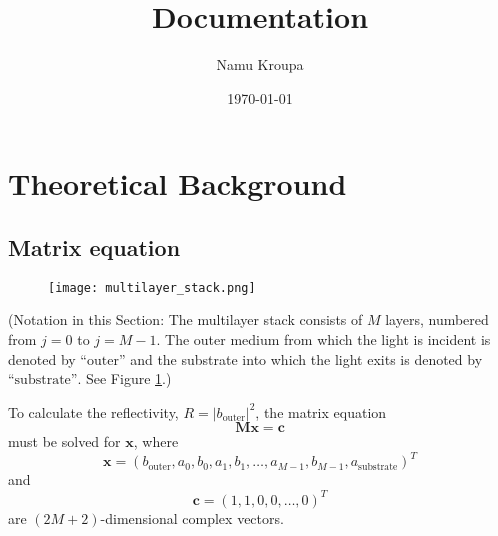 \documentclass[]{article}
\title{Documentation}
\author{Namu Kroupa}
\date{\today}
\begin{document}
	\maketitle
	
	\section{Theoretical Background}
	\subsection{Matrix equation}
	\begin{figure}[H]
		\centering
		\texttt{[image: multilayer\_stack.png]}
		\caption{}
		\label{fig:multilayer-stack}
	\end{figure}
	
	{\small
	(Notation in this Section: The multilayer stack consists of $M$ layers, numbered from $j=0$ to $j=M-1$. The outer medium from which the light is incident is denoted by $\text{``outer''}$ and the substrate into which the light exits is denoted by $\text{``substrate''}$. See Figure \ref{fig:multilayer-stack}.)}
	
	To calculate the reflectivity, $R=|b_\text{outer}|^2$, the matrix equation 
	\begin{equation}\label{eqn:matrix-equation}
		\mathbf{M}\mathbf{x}=\mathbf{c}
	\end{equation}
	must be solved for $\mathbf{x}$, where
	\begin{equation}
		\mathbf{x}=(b_\text{outer},a_0,b_0,a_1,b_1,\dots,a_{M-1},b_{M-1},a_\text{substrate})^T
	\end{equation}
	and
	\begin{equation}
		\mathbf{c}=(1,1,0,0,\dots,0)^T
	\end{equation}
	are $(2M+2)$-dimensional complex vectors.
	
\end{document}
